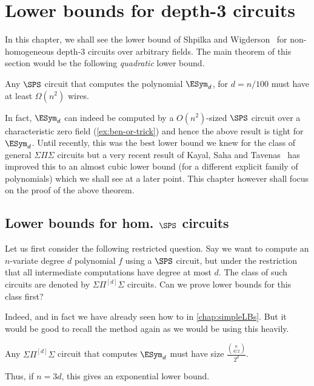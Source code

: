 \chapter{Lower bounds for depth-3 circuits}\label{chap:d3SW}

In this chapter, we shall see the lower bound of Shpilka and Wigderson~\cite{sw2001} for non-homogeneous depth-$3$ circuits over arbitrary fields.
The main theorem of this section would be the following \emph{quadratic} lower bound. 

\begin{theorem}[\cite{sw2001}]\label{thm:SW-SPS-main-thm}
Any $\SPS$ circuit that computes the polynomial $\ESym_d$, for $d = n/100$ must have at least $\Omega(n^2)$ wires. 
\end{theorem}

In fact, $\ESym_d$ can indeed be computed by a $O(n^2)$-sized  $\SPS$ circuit over a characteristic zero field (\autoref{ex:ben-or-trick}) and hence the above result is tight for $\ESym_d$. 
Until recently, this was the best lower bound we knew for the class of general $\Sigma\Pi\Sigma$ circuits but a very recent result of Kayal, Saha and Tavenas~\cite{kst16} has improved this to an almost cubic lower bound (for a different explicit family of polynomials) which we shall see at a later point.
This chapter however shall focus on the proof of the above theorem.

\section{Lower bounds for hom. $\SPS$ circuits \cite{nw1997}}

Let us first consider the following restricted question.
Say we want to compute an $n$-variate degree $d$ polynomial $f$ using a $\SPS$ circuit, but under the restriction that all intermediate computations have degree at most $d$.
The class of such circuits are denoted by $\Sigma\Pi^{[d]}\Sigma$ circuits.
Can we prove lower bounds for this class first?

Indeed, and in fact we have already seen how to in \autoref{chap:simpleLBs}. But it would be good to recall the method again as we would be using this heavily. 

\begin{theorem}[\cite{nw1997}]\label{thm:hom-depth-3-lb-esym}
Any $\Sigma\Pi^{[d]}\Sigma$ circuit that computes $\ESym_d$ must have size $\frac{\binom{n}{d/2}}{2^d}$. 
\end{theorem}
Thus, if $n = 3d$, this gives an exponential lower bound. 

